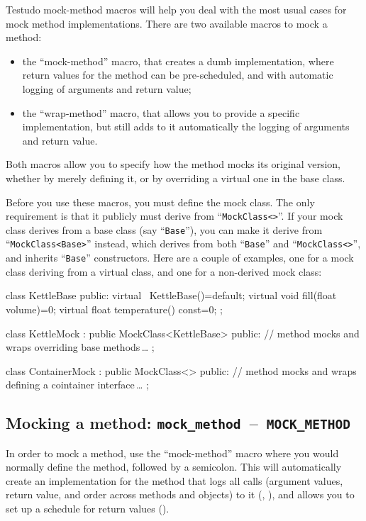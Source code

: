\documentclass[twoside, a4paper, article]{memoir}
\newcommand*\testudocolor{\color{red!80!blue}}
\newcommand*\testudo[1]{\texttt{\testudocolor{}#1}}
\newcommand*\testudopair[2]{\testudo{#1}~--~\testudo{#2}}
\newcommand\subsectiontestudopair[3]{%
  \subsection[#1]{#1: \testudopair{#2}{#3}}}
\newcommand*\ellipsis{\,\ldots}
\begin{document}
Testudo mock-method macros will help you deal with the most usual cases for
mock method implementations.  There are two available macros to mock a method:
\begin{itemize}
\item the ``mock-method'' macro, that creates a dumb implementation, where
  return values for the method can be pre-scheduled, and with automatic
  logging of arguments and return value;
\item the ``wrap-method'' macro, that allows you to provide a specific
  implementation, but still adds to it automatically the logging of arguments
  and return value.
\end{itemize}
Both macros allow you to specify how the method mocks its original version,
whether by merely defining it, or by overriding a virtual one in the base
class.

Before you use these macros, you must define the mock class.  The only
requirement is that it publicly must derive from
``\texttt{MockClass<>}''.  If your mock class derives from a base
class (say ``\texttt{Base}''), you can make it derive from
``\texttt{MockClass<Base>}'' instead, which derives from both
``\texttt{Base}'' and ``\texttt{MockClass<>}'', and inherits
``\texttt{Base}'' constructors.  Here are a couple of examples, one for a mock
class deriving from a virtual class, and one for a non-derived mock class:
\begin{cpplisting}
class KettleBase {
public:
  virtual ~KettleBase()=default;
  virtual void fill(float volume)=0;
  virtual float temperature() const=0;
};

class KettleMock
  : public MockClass<KettleBase> {
public:
  // method mocks and wraps overriding base methods\ellipsis{}
};

class ContainerMock
  : public MockClass<> {
public:
  // method mocks and wraps defining a cointainer interface\ellipsis{}
};
\end{cpplisting}

\subsectiontestudopair{Mocking a method}{mock\_method}{MOCK\_METHOD}
\label{sec:mocking-method}

In order to mock a method, use the ``mock-method'' macro where you would
normally define the method, followed by a semicolon.  This will automatically
create an implementation for the method that logs all calls (argument values,
return value, and order across methods and objects) to it
(, ), and
allows you to set up a schedule for return values
().
\end{document}
